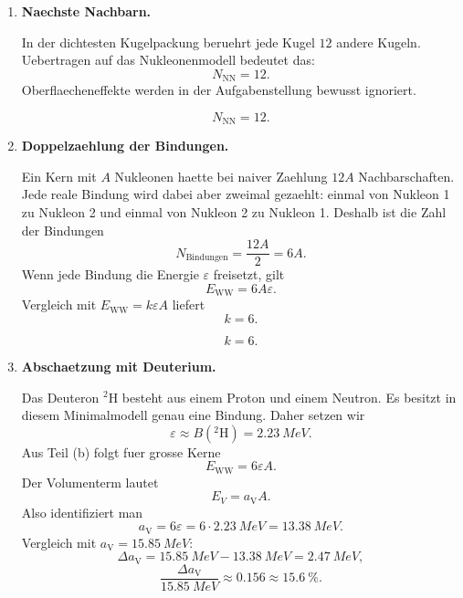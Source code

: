 \documentclass[11pt,a4paper]{scrartcl}
\newcommand{\MeV}{\si{MeV}}
\newcommand{\isotope}[2]{^{#1}\mathrm{#2}}
\theoremstyle{definition}
\theoremstyle{plain}
\theoremstyle{remark}
\newcommand{\EWW}{E_{\mathrm{WW}}}
\newcommand{\aV}{a_{\mathrm V}}
\begin{document}
\begin{enumerate}[label=(\alph*)]
    \item \textbf{Naechste Nachbarn.}

    \begin{solutionbox}
    In der dichtesten Kugelpackung beruehrt jede Kugel $12$ andere Kugeln. Uebertragen auf das Nukleonenmodell bedeutet das:
    \[
        N_{\mathrm{NN}}=12.
    \]
    Oberflaecheneffekte werden in der Aufgabenstellung bewusst ignoriert.
    \end{solutionbox}

    \begin{answerbox}
    \[
        \boxed{N_{\mathrm{NN}}=12}.
    \]
    \end{answerbox}

    \item \textbf{Doppelzaehlung der Bindungen.}

    \begin{calculationbox}
    Ein Kern mit $A$ Nukleonen haette bei naiver Zaehlung $12A$ Nachbarschaften. Jede reale Bindung wird dabei aber zweimal gezaehlt: einmal von Nukleon 1 zu Nukleon 2 und einmal von Nukleon 2 zu Nukleon 1. Deshalb ist die Zahl der Bindungen
    \[
        N_{\mathrm{Bindungen}}=\frac{12A}{2}=6A.
    \]
    Wenn jede Bindung die Energie $\varepsilon$ freisetzt, gilt
    \[
        \EWW=6A\varepsilon.
    \]
    Vergleich mit $\EWW=k\varepsilon A$ liefert
    \[
        k=6.
    \]
    \end{calculationbox}

    \begin{answerbox}
    \[
        \boxed{k=6}.
    \]
    \end{answerbox}

    \item \textbf{Abschaetzung mit Deuterium.}

    \begin{calculationbox}
    Das Deuteron $\isotope{2}{H}$ besteht aus einem Proton und einem Neutron. Es besitzt in diesem Minimalmodell genau eine Bindung. Daher setzen wir
    \[
        \varepsilon \approx B(\isotope{2}{H})=\SI{2.23}{\MeV}.
    \]
    Aus Teil (b) folgt fuer grosse Kerne
    \[
        \EWW=6\varepsilon A.
    \]
    Der Volumenterm lautet
    \[
        E_V=\aV A.
    \]
    Also identifiziert man
    \[
        \aV=6\varepsilon=6\cdot\SI{2.23}{\MeV}=\SI{13.38}{\MeV}.
    \]
    Vergleich mit $\aV=\SI{15.85}{\MeV}$:
    \[
        \Delta \aV=\SI{15.85}{\MeV}-\SI{13.38}{\MeV}=\SI{2.47}{\MeV},
    \]
    \[
        \frac{\Delta \aV}{\SI{15.85}{\MeV}}\approx 0.156\approx \SI{15.6}{\percent}.
    \]
    \end{calculationbox}


\end{enumerate}
\end{document}
